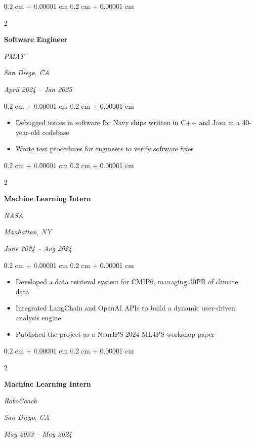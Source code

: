 \documentclass[10pt, letterpaper]{article}
\newenvironment{highlights}{
    \begin{itemize}[
        topsep=0.10 cm,
        parsep=0.10 cm,
        partopsep=0pt,
        itemsep=0pt,
        leftmargin=0.4 cm + 10pt
    ]
}{
    \end{itemize}
} %
\newenvironment{onecolentry}{
    \begin{adjustwidth}{
        0.2 cm + 0.00001 cm
    }{
        0.2 cm + 0.00001 cm
    }
}{
    \end{adjustwidth}
} %
\newenvironment{twocolentry}[2][]{
    \needspace{5\baselineskip}%
    \onecolentry
    \def\secondColumn{#2}
    \setcolumnwidth{\fill, 4.5 cm}
    \begin{paracol}{2}
}{
    \switchcolumn \raggedleft \secondColumn
    \end{paracol}
    \endonecolentry
} %
\begin{document}
        \vspace{0.2 cm}

\begin{twocolentry}{
        \textit{San Diego, CA}    
            
        \textit{April 2024 – Jan 2025}}
            \textbf{Software Engineer}
            
            \textit{PMAT}
        \end{twocolentry}

        \vspace{0.10 cm}
        \begin{onecolentry}
            \begin{highlights}
                \item Debugged issues in software for Navy ships written in C++ and Java in a 40-year-old codebase
                \item Wrote test procedures for engineers to verify software fixes
            \end{highlights}
        \end{onecolentry}

        \vspace{0.2 cm}

\begin{twocolentry}{
        \textit{Manhattan, NY}    
            
        \textit{June 2024 – Aug 2024}}
            \textbf{Machine Learning Intern}
            
            \textit{NASA}
        \end{twocolentry}

        \vspace{0.10 cm}
        \begin{onecolentry}
            \begin{highlights}
                \item Developed a data retrieval system for CMIP6, managing 30PB of climate data
                \item Integrated LangChain and OpenAI APIs to build a dynamic user-driven analysis engine
                \item Published the project as a NeurIPS 2024 ML4PS workshop paper
            \end{highlights}
        \end{onecolentry}

        \vspace{0.2 cm}

\begin{twocolentry}{
        \textit{San Diego, CA}    
            
        \textit{May 2023 – May 2024}}
            \textbf{Machine Learning Intern}
            
            \textit{RoboCoach}
        \end{twocolentry}
\end{document}
